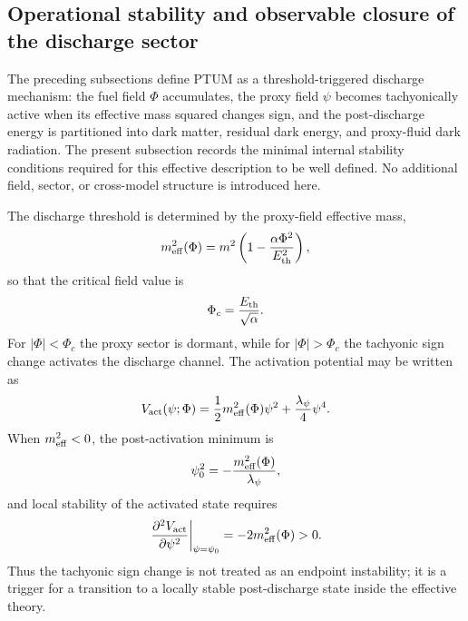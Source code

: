 \documentclass[epj]{svjour}
\begin{document}
\subsection{Operational stability and observable closure of the discharge sector}
\label{subsec:ptum_operational_stability}

The preceding subsections define PTUM as a threshold-triggered discharge
mechanism: the fuel field $\Phi$ accumulates, the proxy field $\psi$ becomes
tachyonically active when its effective mass squared changes sign, and the
post-discharge energy is partitioned into dark matter, residual dark energy,
and proxy-fluid dark radiation.  The present subsection records the minimal
internal stability conditions required for this effective description to be
well defined.  No additional field, sector, or cross-model structure is
introduced here.

The discharge threshold is determined by the proxy-field effective mass,
\begin{equation}
m_{\rm eff}^2(\Phi)
=
m^2
\left(
1-\frac{\alpha\Phi^2}{E_{\rm th}^2}
\right),
\label{eq:PTUM_meff_operational}
\end{equation}
so that the critical field value is
\begin{equation}
\Phi_c
=
\frac{E_{\rm th}}{\sqrt{\alpha}} .
\label{eq:PTUM_critical_phi_operational}
\end{equation}
For $|\Phi|<\Phi_c$ the proxy sector is dormant, while for
$|\Phi|>\Phi_c$ the tachyonic sign change activates the discharge channel.
The activation potential may be written as
\begin{equation}
V_{\rm act}(\psi;\Phi)
=
\frac{1}{2}m_{\rm eff}^2(\Phi)\psi^2
+
\frac{\lambda_\psi}{4}\psi^4 .
\label{eq:PTUM_activation_potential_operational}
\end{equation}
When $m_{\rm eff}^2<0$, the post-activation minimum is
\begin{equation}
\psi_0^2
=
-\frac{m_{\rm eff}^2(\Phi)}{\lambda_\psi},
\label{eq:PTUM_proxy_minimum_operational}
\end{equation}
and local stability of the activated state requires
\begin{equation}
\left.
\frac{\partial^2 V_{\rm act}}{\partial \psi^2}
\right|_{\psi=\psi_0}
=
-2m_{\rm eff}^2(\Phi)
>
0 .
\label{eq:PTUM_potential_stability_operational}
\end{equation}
Thus the tachyonic sign change is not treated as an endpoint instability;
it is a trigger for a transition to a locally stable post-discharge state
inside the effective theory.
\end{document}
